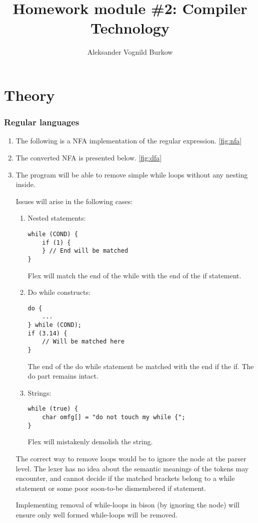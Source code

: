 \documentclass[a4paper]{article}
\title{Homework module \#2: Compiler Technology}
\author{Aleksander Vognild Burkow}
\begin{document}
\maketitle
\thispagestyle{empty}
\newpage

\part{Theory}
\section{Regular languages}

\begin{enumerate}[label=\alph*)]
\item
    The following is a NFA implementation of the regular expression. \ref{fig:nfa}
    

\item
    The converted NFA is presented below. \ref{fig:dfa}
    

\newpage
\item
    The program will be able to remove simple while loops without any nesting inside.

    Issues will arise in the following cases:
    \begin{enumerate}[label=\roman*]
    \item
    Nested statements:

\begin{lstlisting}
while (COND) {
    if (1) {
    } // End will be matched
}
\end{lstlisting}

    Flex will match the end of the while with the end of the if statement.

    \item
    Do while constructs:
\begin{lstlisting}
do {
    ...
} while (COND);
if (3.14) {
    // Will be matched here
}
\end{lstlisting}

    The end of the do while statement be matched with the end if the if. The do part remains intact.

    \item
    Strings:

\begin{lstlisting}
while (true) {
    char omfg[] = "do not touch my while {";
}
\end{lstlisting}

    Flex will mistakenly demolish the string.
    \end{enumerate}

The correct way to remove loops would be to ignore the node at the parser level. The lexer has no idea about the semantic meanings of the tokens may encounter, and cannot decide if the matched brackets belong to a while statement or some poor soon-to-be dismembered if statement.

Implementing removal of while-loops in bison (by ignoring the node) will ensure only well formed while-loops will be removed.


\end{enumerate}
\end{document}
